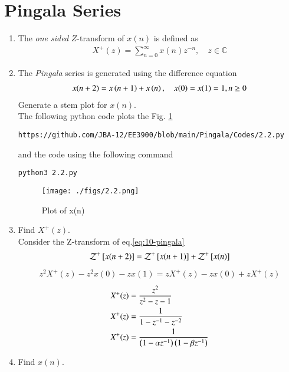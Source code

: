 \documentclass[journal,12pt,twocolumn]{IEEEtran}
\renewcommand\thesection{\arabic{section}}
\begin{document}
\section{Pingala Series}
\begin{enumerate}[label=\thesection.\arabic*,ref=\thesection.\theenumi]
\item The {\em one sided} $Z$-transform of $x(n)$ is defined as 
\begin{align}
	X^{+}(z) = \sum_{n = 0}^{\infty}x(n)z^{-n}, \quad z \in \mathbb{C}
\label{eq:one-Z}
\end{align}
\item The {\em Pingala} series is generated using the difference equation 
\begin{align}
	x(n+2) = x\left(n+1\right) + x\left(n\right),  \quad x(0) = x(1) = 1, n \ge 0
	\label{eq:10-pingala}
\end{align}
Generate a stem plot for $x(n)$.\\
\solution The following python code plots the Fig. \ref{fig-2.2} 
\begin{lstlisting}
https://github.com/JBA-12/EE3900/blob/main/Pingala/Codes/2.2.py
\end{lstlisting}
and the code using the following command 
\begin{lstlisting}
python3 2.2.py
\end{lstlisting}
\begin{figure}[!htbp]
\centering
\texttt{[image: ./figs/2.2.png]}
\caption{Plot of x(n)}
\label{fig-2.2}	
\end{figure}
\item 		Find $X^{+}(z)$.\\
\solution Consider the Z-transform of eq.\ref{eq:10-pingala}
\begin{align}
\mathcal{Z}^{+}{}\left[x(n+2)\right] = \mathcal{Z}^{+}{}\left[x(n+1)\right] + \mathcal{Z}^{+}{}\left[x(n)\right]
\end{align}
\begin{align}
z^2X^{+}(z) - z^2x(0) - zx(1) = zX^{+}(z) - zx(0) + zX^{+}(z)
\end{align}
\begin{align}
X^{+}(z) &= \frac{z^2}{z^2 - z - 1}\\
X^{+}(z) &= \frac{1}{1-z^{-1}-z^{-2}}\\ X^{+}(z) &= \frac{1}{\brak{1-\alpha z^{-1}}\brak{1-\beta z^{-1}}}
\label{eq - X^{+}(z)}
\end{align}
\item Find $x(n)$.\\

\end{enumerate}
\end{document}
